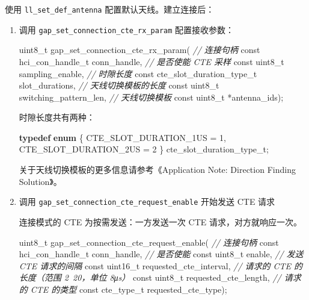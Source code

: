 \documentclass[
  12pt,
]{book}
\newenvironment{Shaded}{\begin{snugshade}}{\end{snugshade}}
\newcommand{\CommentTok}[1]{\textcolor[rgb]{0.56,0.35,0.01}{\textit{#1}}}
\newcommand{\DataTypeTok}[1]{\textcolor[rgb]{0.13,0.29,0.53}{#1}}
\newcommand{\DecValTok}[1]{\textcolor[rgb]{0.00,0.00,0.81}{#1}}
\newcommand{\KeywordTok}[1]{\textcolor[rgb]{0.13,0.29,0.53}{\textbf{#1}}}
\newcommand{\NormalTok}[1]{#1}
\begin{document}
使用 \texttt{ll\_set\_def\_antenna} 配置默认天线。建立连接后：

\begin{enumerate}
\def\labelenumi{\arabic{enumi}.}
\item
  调用 \texttt{gap\_set\_connection\_cte\_rx\_param} 配置接收参数：

\begin{Shaded}
\begin{Highlighting}[]
\DataTypeTok{uint8_t}\NormalTok{ gap_set_connection_cte_rx_param(}
  \CommentTok{// 连接句柄}
  \DataTypeTok{const}\NormalTok{ hci_con_handle_t  conn_handle,}
  \CommentTok{// 是否使能 CTE 采样}
  \DataTypeTok{const} \DataTypeTok{uint8_t}\NormalTok{           sampling_enable,}
  \CommentTok{// 时隙长度}
  \DataTypeTok{const}\NormalTok{ cte_slot_duration_type_t slot_durations,}
  \CommentTok{// 天线切换模板的长度}
  \DataTypeTok{const} \DataTypeTok{uint8_t}\NormalTok{           switching_pattern_len,}
  \CommentTok{// 天线切换模板}
  \DataTypeTok{const} \DataTypeTok{uint8_t}\NormalTok{          *antenna_ids);}
\end{Highlighting}
\end{Shaded}

  时隙长度共有两种：

\begin{Shaded}
\begin{Highlighting}[]
\KeywordTok{typedef} \KeywordTok{enum}
\NormalTok{\{}
\NormalTok{    CTE_SLOT_DURATION_1US = }\DecValTok{1}\NormalTok{,}
\NormalTok{    CTE_SLOT_DURATION_2US = }\DecValTok{2}
\NormalTok{\} cte_slot_duration_type_t;}
\end{Highlighting}
\end{Shaded}

  关于天线切换模板的更多信息请参考《Application Note: Direction Finding Solution》。
\item
  调用 \texttt{gap\_set\_connection\_cte\_request\_enable} 开始发送 CTE 请求

  连接模式的 CTE 为按需发送：一方发送一次 CTE 请求，对方就响应一次。

\begin{Shaded}
\begin{Highlighting}[]
\DataTypeTok{uint8_t}\NormalTok{ gap_set_connection_cte_request_enable(}
  \CommentTok{// 连接句柄}
  \DataTypeTok{const}\NormalTok{ hci_con_handle_t  conn_handle,}
  \CommentTok{// 是否使能}
  \DataTypeTok{const} \DataTypeTok{uint8_t}\NormalTok{           enable,}
  \CommentTok{// 发送 CTE 请求的间隔}
  \DataTypeTok{const} \DataTypeTok{uint16_t}\NormalTok{          requested_cte_interval,}
  \CommentTok{// 请求的 CTE 的长度（范围 2~20，单位 8μs）}
  \DataTypeTok{const} \DataTypeTok{uint8_t}\NormalTok{           requested_cte_length,}
  \CommentTok{// 请求的 CTE 的类型}
  \DataTypeTok{const}\NormalTok{ cte_type_t        requested_cte_type);}
\end{Highlighting}
\end{Shaded}


\end{enumerate}
\end{document}
